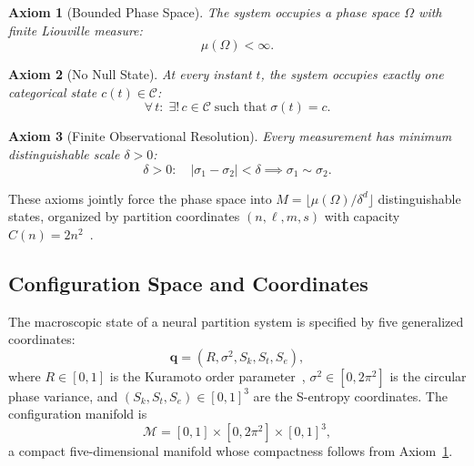 \documentclass[aps,prd,twocolumn,superscriptaddress,floatfix,nofootinbib]{revtex4-2}
\newtheorem{axiom}{Axiom}
\theoremstyle{remark}
\newcommand{\Sk}{S_k}
\newcommand{\St}{S_t}
\newcommand{\Se}{S_e}
\newcommand{\qvec}{\mathbf{q}}
\begin{document}
\begin{axiom}[Bounded Phase Space]
\label{ax:bounded}
The system occupies a phase space $\Omega$ with finite Liouville measure:
\begin{equation}
    \boxed{\mu(\Omega) < \infty.}
    \label{eq:bounded}
\end{equation}
\end{axiom}

\begin{axiom}[No Null State]
\label{ax:nonull}
At every instant $t$, the system occupies exactly one categorical state $c(t) \in \mathcal{C}$:
\begin{equation}
    \boxed{\forall\, t:\; \exists!\, c \in \mathcal{C} \;\text{such that}\; \sigma(t) = c.}
    \label{eq:exclusion}
\end{equation}
\end{axiom}

\begin{axiom}[Finite Observational Resolution]
\label{ax:resolution}
Every measurement has minimum distinguishable scale $\delta > 0$:
\begin{equation}
    \boxed{\delta > 0:\quad |\sigma_1 - \sigma_2| < \delta \implies \sigma_1 \sim \sigma_2.}
    \label{eq:resolution}
\end{equation}
\end{axiom}

These axioms jointly force the phase space into $M = \lfloor \mu(\Omega)/\delta^d \rfloor$ distinguishable states, organized by partition coordinates $(n, \ell, m, s)$ with capacity $C(n) = 2n^2$~\cite{sachikonye2026operator}.

\subsection{Configuration Space and Coordinates}

The macroscopic state of a neural partition system is specified by five generalized coordinates:
\begin{equation}
\qvec = (R, \sigma^2, \Sk, \St, \Se),
\label{eq:gen_coords}
\end{equation}
where $R \in [0,1]$ is the Kuramoto order parameter~\cite{kuramoto1975}, $\sigma^2 \in [0, 2\pi^2]$ is the circular phase variance, and $(\Sk, \St, \Se) \in [0,1]^3$ are the S-entropy coordinates.
The configuration manifold is
\begin{equation}
\mathcal{M} = [0,1] \times [0, 2\pi^2] \times [0,1]^3,
\end{equation}
a compact five-dimensional manifold whose compactness follows from Axiom~\ref{ax:bounded}.
\end{document}
